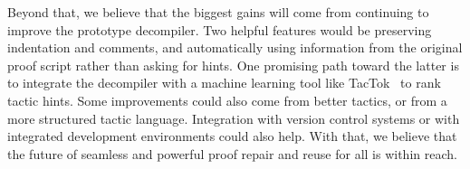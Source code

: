 Beyond that, we believe that the biggest gains will come from continuing to improve the prototype decompiler.
Two helpful features would be preserving indentation and comments, and automatically using information from the original proof script rather than asking for hints.
One promising path toward the latter is to integrate the decompiler with a machine learning tool like TacTok~\cite{10.1145/3428299} to rank tactic hints.
Some improvements could also come from better tactics,
or from a more structured tactic language.
Integration with version control systems or with integrated development environments could also help.
With that, we believe that the future of seamless and powerful proof repair and reuse for all is within reach.


